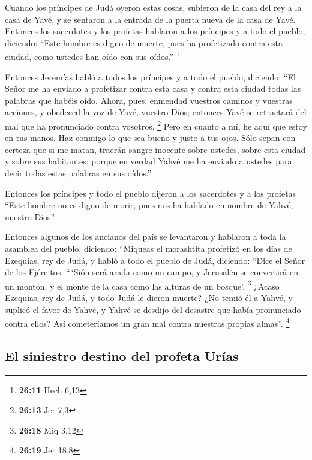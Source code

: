 Cuando los príncipes de Judá oyeron estas cosas,
subieron de la casa del rey a la casa de Yavé, y se sentaron a la
entrada de la puerta nueva de la casa de Yavé.  Entonces
los sacerdotes y los profetas hablaron a los príncipes y a todo el
pueblo, diciendo: ``Este hombre es digno de muerte, pues ha profetizado
contra esta ciudad, como ustedes han oído con sus oídos.'' \footnote{\textbf{26:11}
  Hech 6,13}

 Entonces Jeremías habló a todos los príncipes y a todo
el pueblo, diciendo: ``El Señor me ha enviado a profetizar contra esta
casa y contra esta ciudad todas las palabras que habéis oído.
 Ahora, pues, enmendad vuestros caminos y vuestras
acciones, y obedeced la voz de Yavé, vuestro Dios; entonces Yavé se
retractará del mal que ha pronunciado contra vosotros. \footnote{\textbf{26:13}
  Jer 7,3}  Pero en cuanto a mí, he aquí que estoy en tus
manos. Haz conmigo lo que sea bueno y justo a tus ojos. 
Sólo sepan con certeza que si me matan, traerán sangre inocente sobre
ustedes, sobre esta ciudad y sobre sus habitantes; porque en verdad
Yahvé me ha enviado a ustedes para decir todas estas palabras en sus
oídos.''

 Entonces los príncipes y todo el pueblo dijeron a los
sacerdotes y a los profetas ``Este hombre no es digno de morir, pues nos
ha hablado en nombre de Yahvé, nuestro Dios''.

 Entonces algunos de los ancianos del país se levantaron
y hablaron a toda la asamblea del pueblo, diciendo: 
``Miqueas el morashtita profetizó en los días de Ezequías, rey de Judá,
y habló a todo el pueblo de Judá, diciendo: ``Dice el Señor de los
Ejércitos: ``\,`Sión será arada como un campo, y Jerusalén se convertirá
en un montón, y el monte de la casa como las alturas de un bosque'.
\footnote{\textbf{26:18} Miq 3,12}  ¿Acaso Ezequías, rey
de Judá, y todo Judá le dieron muerte? ¿No temió él a Yahvé, y suplicó
el favor de Yahvé, y Yahvé se desdijo del desastre que había pronunciado
contra ellos? Así cometeríamos un gran mal contra nuestras propias
almas''. \footnote{\textbf{26:19} Jer 18,8}

\hypertarget{el-siniestro-destino-del-profeta-uruxedas}{%
\subsection{El siniestro destino del profeta
Urías}\label{el-siniestro-destino-del-profeta-uruxedas}}

